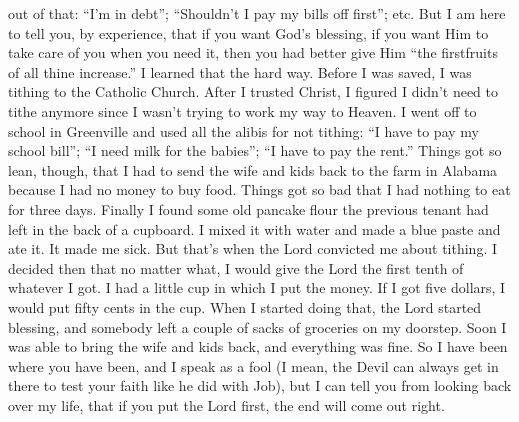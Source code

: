 {out of that: “I’m in debt”; “Shouldn’t I pay my
bills off first”; etc. But I am here to tell you, by
experience, that if you want God’s blessing, if
you want Him to take care of you when you
need it, then you had better give Him “the
firstfruits of all thine increase.”
I learned that the hard way. Before I was saved, I was tithing to the Catholic Church. After I trusted Christ, I figured I didn’t need to tithe anymore since I wasn’t trying to work my way to Heaven. I went off to school in
Greenville and used all the alibis for not tithing: “I have to pay my school bill”; “I need milk for
the babies”; “I have to pay the rent.” Things got so lean, though, that I had to send the wife and
kids back to the farm in Alabama because I had no money to buy food.
Things got so bad that I had nothing to eat for three days. Finally I found some old pancake flour the previous tenant had left in the back of a cupboard. I mixed it with water and made a blue paste and ate it. It made me sick. But that’s when the Lord convicted me about tithing. I decided then that no matter what, I would give the Lord the first tenth of whatever I got. I had a little cup in which I put the money. If I got five dollars, I would put fifty cents in the cup. When I started doing that, the Lord started blessing, and somebody left a couple of sacks of groceries on my doorstep. Soon I was able to bring the wife and kids back, and everything was fine. So I have been where you have been, and I speak as a fool (I mean, the Devil can always get in there to test your faith like he did with Job), but I can tell you from looking back over my life, that if you put the Lord first, the end will come out right.}
